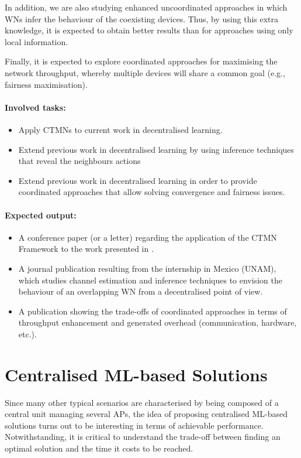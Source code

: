 \documentclass[12pt, a4paper,twoside]{tesi_upf}
\begin{document}
			In addition, we are also studying enhanced uncoordinated approaches in which WNs infer the behaviour of the coexisting devices. Thus, by using this extra knowledge, it is expected to obtain better results than for approaches using only local information. 
				
			Finally, it is expected to explore coordinated approaches for maximising the network throughput, whereby multiple devices will share a common goal (e.g., fairness maximisation). 
				
			\paragraph{Involved tasks:}		
			\begin{itemize}
				\item Apply CTMNs to current work in decentralised learning.
				\item Extend previous work in decentralised learning by using inference techniques that reveal the neighbours actions
				\item Extend previous work in decentralised learning in order to provide coordinated approaches that allow solving convergence and fairness issues.
			\end{itemize}	
		
			\paragraph{Expected output:}		
			\begin{itemize}
				\item A conference paper (or a letter) regarding the application of the CTMN Framework to the work presented in \cite{wilhelmi2017implications}. 
				\item A journal publication resulting from the internship in Mexico (UNAM), which studies channel estimation and inference techniques to envision the behaviour of an overlapping WN from a decentralised point of view.
				\item A publication showing the trade-offs of coordinated approaches in terms of throughput enhancement and generated overhead (communication, hardware, etc.).
			\end{itemize}		

		\section{Centralised ML-based Solutions}
		\label{section:contribution4}		
			Since many other typical scenarios are characterised by being composed of a central unit managing several APs, the idea of proposing centralised ML-based solutions turns out to be interesting in terms of achievable performance. Notwithstanding, it is critical to understand the trade-off between finding an optimal solution and the time it costs to be reached.
			
\end{document}
